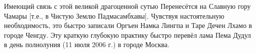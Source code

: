 \scriptsize
Имеющий связь с этой великой драгоценной сутью
Перенесётся на Славную гору Чамары [т.е., в Чистую Землю Падмасамбхавы].
Чувствуя настоятельную необходимость,
это быстро записали Оргъен Намка Лингпа и Таре Дечен Лхамо в городе Ченгду.
Эту краткую глубокую практику быстро перевёл лама Пема Дудул
в день полнолуния (11 июля 2006 г.) в городе Москва.
